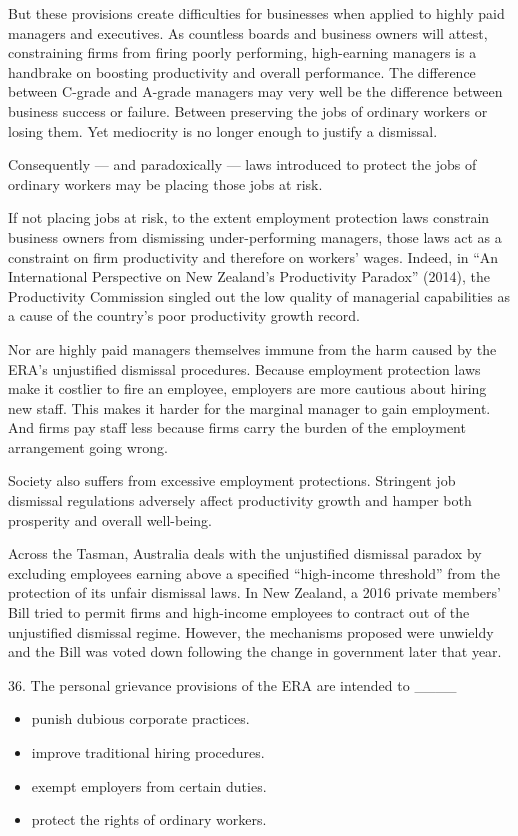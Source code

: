 \documentclass[UTF8,11pt]{ctexart}
\begin{document}
But these provisions create difficulties for businesses when applied to highly paid managers and executives. As countless boards and business owners will attest, constraining firms from firing poorly performing, high-earning managers is a handbrake on boosting productivity and overall performance. The difference between C-grade and A-grade managers may very well be the difference between business success or failure. Between preserving the jobs of ordinary workers or losing them. Yet mediocrity is no longer enough to justify a dismissal.


Consequently — and paradoxically — laws introduced to protect the jobs of ordinary workers may be placing those jobs at risk.


If not placing jobs at risk, to the extent employment protection laws constrain business owners from dismissing under-performing managers, those laws act as a constraint on firm productivity and therefore on workers’ wages. Indeed, in “An International Perspective on New Zealand’s Productivity Paradox” (2014), the Productivity Commission singled out the low quality of managerial capabilities as a cause of the country’s poor productivity growth record.


Nor are highly paid managers themselves immune from the harm caused by the ERA’s unjustified dismissal procedures. Because employment protection laws make it costlier to fire an employee, employers are more cautious about hiring new staff. This makes it harder for the marginal manager to gain employment. And firms pay staff less because firms carry the burden of the employment arrangement going wrong.


Society also suffers from excessive employment protections. Stringent job dismissal regulations adversely affect productivity growth and hamper both prosperity and overall well-being.


Across the Tasman, Australia deals with the unjustified dismissal paradox by excluding employees earning above a specified “high-income threshold” from the protection of its unfair dismissal laws. In New Zealand, a 2016 private members’ Bill tried to permit firms and high-income employees to contract out of the unjustified dismissal regime. However, the mechanisms proposed were unwieldy and the Bill was voted down following the change in government later that year.


36. The personal grievance provisions of the ERA are intended to \_\_\_\_


\begin{itemize}[leftmargin=2em,itemsep=.2em,topsep=.4em]\item[A.] punish dubious corporate practices.
\item[B.] improve traditional hiring procedures.
\item[C.] exempt employers from certain duties.
\item[D.] protect the rights of ordinary workers.
\end{itemize}
\end{document}
